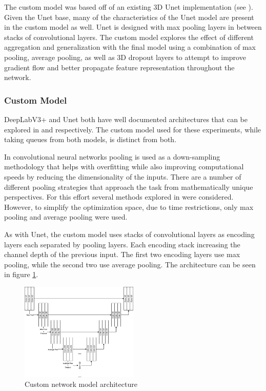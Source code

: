 \documentclass[10pt,twocolumn,letterpaper]{article}
\begin{document}
The custom model was based off of an existing 3D Unet implementation (see \cite{10.7554/eLife.57613}). Given the Unet base, many of the characteristics of the Unet model are present in the custom model as well. Unet is designed with max pooling layers in between stacks of convolutional layers. The custom model explores the effect of different aggregation and generalization with the final model using a combination of max pooling, average pooling, as well as 3D dropout layers to attempt to improve gradient flow and better propagate feature representation throughout the network.

\subsubsection{Custom Model}

DeepLabV3+ and Unet both have well documented architectures that can be explored in \cite{https://doi.org/10.48550/arxiv.1802.02611} and \cite{https://doi.org/10.48550/arxiv.1505.04597} respectively. The custom model used for these experiments, while taking queues from both models, is distinct from both.

In convolutional neural networks pooling is used as a down-sampling methodology that helps with overfitting while also improving computational speeds by reducing the dimensionality of the inputs. There are a number of different pooling strategies that approach the task from mathematically unique perspectives. For this effort several methods explored in \cite{https://doi.org/10.48550/arxiv.2009.07485} were considered. However, to simplify the optimization space, due to time restrictions, only max pooling and average pooling were used.

As with Unet, the custom model uses stacks of convolutional layers as encoding layers each separated by pooling layers. Each encoding stack increasing the channel depth of the previous input. The first two encoding layers use max pooling, while the second two use average pooling. The architecture can be seen in figure \ref{fig:custom-model-arch}.

\begin{figure}[h]
\centering
\includegraphics[width=0.5\textwidth]{figures/custom-model.png}
\caption{Custom network model architecture}
\label{fig:custom-model-arch}
\end{figure}
\end{document}
